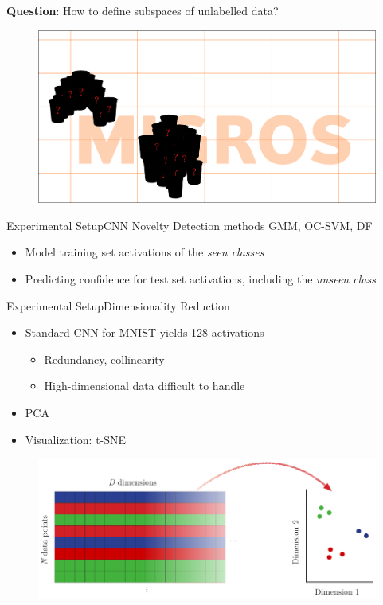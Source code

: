 \documentclass[xcolor={usenames,dvipsnames}]{beamer}
\begin{document}
\begin{frame}{}
\textbf{Question}: How to define subspaces of unlabelled data?
\begin{figure}
\centering
\includegraphics[width=\textwidth]{labelled-data-migros-new}
\end{figure}
\end{frame}

\begin{frame}{Experimental Setup}{CNN}
Novelty Detection methods \gls{GMM}, \gls{OC-SVM}, \gls{DF}
\begin{itemize}
	\item Model training set activations of the \textit{seen classes}
	\item Predicting confidence for test set activations, including the \textit{unseen class}
\end{itemize}
\end{frame}

\begin{frame}{Experimental Setup}{Dimensionality Reduction}
	\begin{itemize}
		\item Standard \gls{CNN} for \gls{MNIST} yields 128 activations\\
		\begin{itemize}
			\item Redundancy, collinearity
			\item High-dimensional data difficult to handle
		\end{itemize}
		\item \gls{PCA}
		\item Visualization: \gls{t-SNE}
	\end{itemize}
	\begin{figure}[H]
		\centering
		\includegraphics[width=.8\textwidth]{t-SNE-schema}
	\end{figure}
\end{frame}
\end{document}
